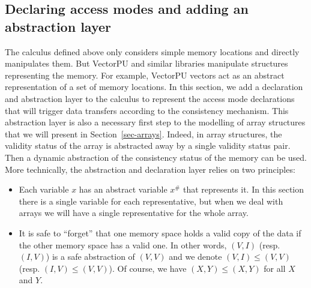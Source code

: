 \documentclass[preprint,12pt]{elsarticle}
\newcommand{\symb}[1]{\textit{#1}}
\newcommand{\Pull}{\symb{Pull}}
\newcommand{\isvalid}{\symb{isValid}}
\newcommand{\abs}[1]{#1^\#}
\begin{document}
%


\subsection{Declaring access modes and adding an abstraction layer}
The calculus defined above only considers simple memory locations and directly manipulates 
them.
But VectorPU and  similar libraries manipulate structures 
representing the memory. For example, VectorPU vectors act as an
 abstract representation of a set of memory 
locations. In this section, we add a declaration and abstraction layer to the calculus to 
represent the access mode declarations that will trigger data transfers according to the 
consistency mechanism. 
This abstraction layer is also a necessary first step to the modelling of array 
structures that we will present in Section~\ref{sec-arrays}. Indeed, in array structures, 
the 
validity status of the array is abstracted away by a single validity status pair. Then 
a dynamic abstraction of the consistency status of the memory can be used.
More technically, the abstraction and declaration layer relies on two principles:
\begin{itemize}
\item Each variable $x$ has an abstract variable $\abs x$ that represents it. In this 
section there is 
a single variable for each representative, but when we deal with arrays we will 
have a single representative for the whole array.
\item It is safe to ``forget'' that one memory space holds a valid copy of the data if 
the other memory space has a valid one. In other words, $(V,I)$ (resp. $(I,V)$) is a safe 
abstraction of $(V,V)$ and we denote $(V,I)\leq (V,V)$ (resp. $(I,V)\leq (V,V)$). Of 
course, we have $(X,Y)\leq (X,Y)$ for all $X$ and $Y$.
\end{itemize}
\end{document}
